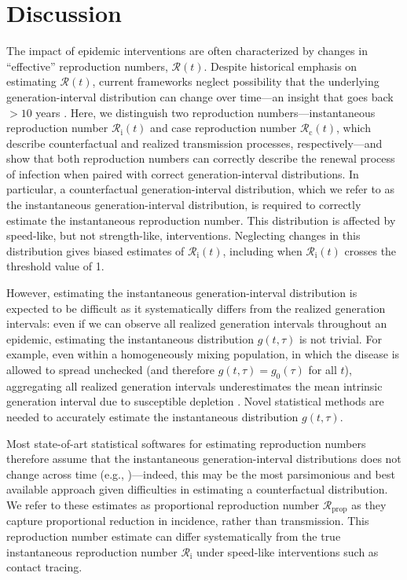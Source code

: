 \documentclass[12pt]{article}
\newcommand{\Rx}[1]{\ensuremath{{\mathcal R}_{#1}}\xspace}
\newcommand{\Rc}{\Rx{\mathrm{c}}}
\newcommand{\Ri}{\Rx{\mathrm{i}}}
\newcommand{\RR}{\ensuremath{{\mathcal R}}\xspace}
\newcommand{\Rprop}{\Rx{\mathrm{prop}}}
\begin{document}
\section{Discussion}

The impact of epidemic interventions are often characterized by changes in ``effective'' reproduction numbers, $\RR(t)$.
Despite historical emphasis on estimating $\RR(t)$, current frameworks neglect possibility that the underlying generation-interval distribution can change over time---an insight that goes back $>10$ years \citep{fraser2007estimating}.
Here, we distinguish two reproduction numbers---instantaneous reproduction number $\Ri(t)$ and case reproduction number $\Rc(t)$, which describe counterfactual and realized transmission processes, respectively---and show that both reproduction numbers can correctly describe the renewal process of infection when paired with correct generation-interval distributions.
In particular, a counterfactual generation-interval distribution, which we refer to as the instantaneous generation-interval distribution, is required to correctly estimate the instantaneous reproduction number. 
This distribution is affected by speed-like, but not strength-like, interventions.
Neglecting changes in this distribution gives biased estimates of $\Ri(t)$, including when $\Ri(t)$ crosses the threshold value of 1.

However, estimating the instantaneous generation-interval distribution is expected to be difficult as it systematically differs from the realized generation intervals: even if we can observe all realized generation intervals throughout an epidemic, estimating the instantaneous distribution $g(t, \tau)$ is not trivial.
For example, even within a homogeneously mixing population, in which the disease is allowed to spread unchecked (and therefore $g(t, \tau) = g_0(\tau)$ for all $t$), aggregating all realized generation intervals underestimates the mean intrinsic generation interval due to susceptible depletion \citep{park2020inferring}.
Novel statistical methods are needed to accurately estimate the instantaneous distribution $g(t, \tau)$.

Most state-of-art statistical softwares for estimating reproduction numbers therefore assume that the instantaneous generation-interval distributions does not change across time (e.g., \citep{10.12688/wellcomeopenres.16006.2,flaxman2020estimating,brauner2021inferring})---indeed, this may be the most parsimonious and best available approach given difficulties in estimating a counterfactual distribution.
We refer to these estimates as proportional reproduction number $\Rprop$ as they capture proportional reduction in incidence, rather than transmission.
This reproduction number estimate can differ systematically from the true instantaneous reproduction number $\Ri$ under speed-like interventions such as contact tracing.
\end{document}
